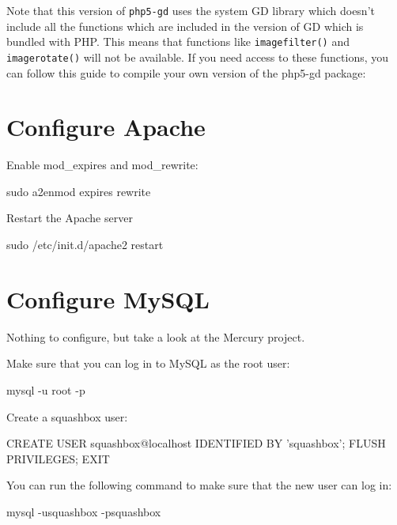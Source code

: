 \documentclass[ebook,10pt,twoside,openright]{memoir}
\begin{document}
Note that this version of \verb!php5-gd! uses the system GD library which doesn’t include all the functions which are included in the version of GD which is bundled with PHP. This means that functions like \verb!imagefilter()! and \verb!imagerotate()! will not be available. If you need access to these functions, you can follow this guide to compile your own version of the php5-gd package:


\section{Configure Apache}

Enable mod\_expires and mod\_rewrite:

\begin{squashboxcommand}
sudo a2enmod expires rewrite
\end{squashboxcommand}

Restart the Apache server

\begin{squashboxcommand}
sudo /etc/init.d/apache2 restart
\end{squashboxcommand}

\section{Configure MySQL}

Nothing to configure, but take a look at the Mercury project.

Make sure that you can log in to MySQL as the root user:

\begin{squashboxcommand}
mysql -u root -p
\end{squashboxcommand}

Create a squashbox user:

\begin{squashboxcommand}
CREATE USER squashbox@localhost IDENTIFIED BY 'squashbox';
FLUSH PRIVILEGES;
EXIT
\end{squashboxcommand}

You can run the following command to make sure that the new user can log in:

\begin{squashboxcommand}
mysql -usquashbox -psquashbox
\end{squashboxcommand}
\end{document}
